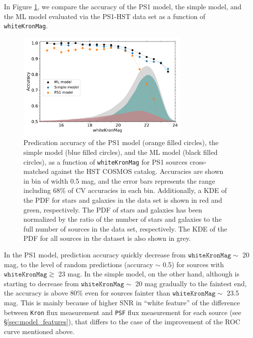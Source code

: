 \documentclass[twocolumn]{aastex62}
\begin{document}
{In Figure \ref{fig:cvacc_hst}, we compare the accuracy 
of the PS1 model, the simple model, and the ML model
evaluated via the PS1-HST data set as a function of \texttt{whiteKronMag}. 
\begin{figure}[t]
 \centering
  \includegraphics[width=3.35in, bb = 0 0 576 360]{./Figures/CV_Accuracy_HST.pdf}
  \caption{
  Predication accuracy of the PS1 model (orange filled circles), the simple model (blue filled circles), 
  and the ML model (black filled circles), as a function of \texttt{whiteKronMag} 
  for PS1 sources cross-matched against the HST COSMOS catalog. 
  Accuracies are shown in bin of width 0.5 mag, and the error bars 
  represents the range including 68\% of CV accuracies in each bin. 
  Additionally, a KDE of the PDF for stars and galaxies in the data set is shown in red and green, respectively. 
  The PDF of stars and galaxies has been normalized by the ratio of the number of stars and galaxies 
  to the full number of sources in the data set, respectively. 
  The KDE of the PDF for all sources in the dataset is also shown in grey.
  }
  \label{fig:cvacc_hst}
\end{figure}
In the PS1 model, prediction accuracy quickly decrease from $\mathtt{whiteKronMag} \sim $ 20 mag, 
to the level of random predictions (accuracy $\sim$ 0.5) for sources with $\mathtt{whiteKronMag} \gtrsim $ 23 mag. 
In the simple model, on the other hand, 
although is starting to decrease from $\mathtt{whiteKronMag} \sim $ 20 mag gradually to the faintest end, 
the accuracy is above 80\% even for sources fainter than $\mathtt{whiteKronMag} \sim $ 23.5 mag. 
This is mainly because of higher SNR in ``white feature'' of the difference 
between \texttt{Kron} flux measurement and \texttt{PSF} flux measurement for each source (see \S\ref{sec:model_features}), 
that differs to the case of the improvement of the ROC curve mentioned above. 

}
\end{document}

